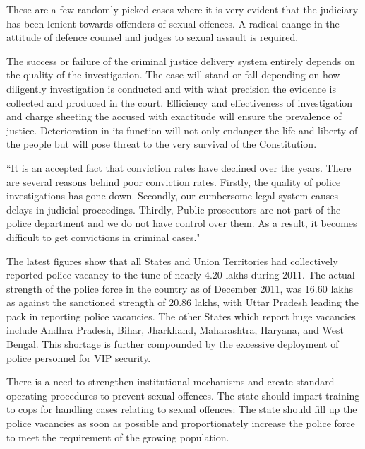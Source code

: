 \begin{multicols}{2}
\noi
These are a few randomly picked cases where it is very evident that the judiciary has
been lenient towards offenders of sexual offences. A radical change in the attitude of
defence counsel and judges to sexual assault is required.


\noi
The success or failure of the criminal justice delivery system entirely depends on the
quality of the investigation. The case will stand or fall depending on how diligently
investigation is conducted and with what precision the evidence is collected and
produced in the court. Efficiency and effectiveness of investigation and charge sheeting
the accused with exactitude will ensure the prevalence of justice. Deterioration in its
function will not only endanger the life and liberty of the people but will pose threat to
the very survival of the Constitution.


\vspace{-.1cm}

\noi
“It is an accepted fact that conviction rates have declined over the years. There are
several reasons behind poor conviction rates. Firstly, the quality of police investigations
has gone down. Secondly, our cumbersome legal system causes delays in judicial
proceedings. Thirdly, Public prosecutors are not part of the police department and we
do not have control over them. As a result, it becomes difficult to get convictions in
criminal cases."

\vspace{-.1cm}

\noi
The latest figures show that all States and Union Territories had collectively reported
police vacancy to the tune of nearly 4.20 lakhs during 2011. The actual strength of the
police force in the country as of December 2011, was 16.60 lakhs as against the sanctioned strength of 20.86 lakhs, with Uttar Pradesh leading the pack in reporting
police vacancies. The other States which report huge vacancies include Andhra
Pradesh, Bihar, Jharkhand, Maharashtra, Haryana, and West Bengal. This shortage is
further compounded by the excessive deployment of police personnel for VIP security.

\vspace{-.1cm}

\noi
There is a need to strengthen institutional mechanisms and create standard operating
procedures to prevent sexual offences. The state should impart training to cops for
handling cases relating to sexual offences: The state should fill up the police vacancies
as soon as possible and proportionately increase the police force to meet the
requirement of the growing population.


\end{multicols}

